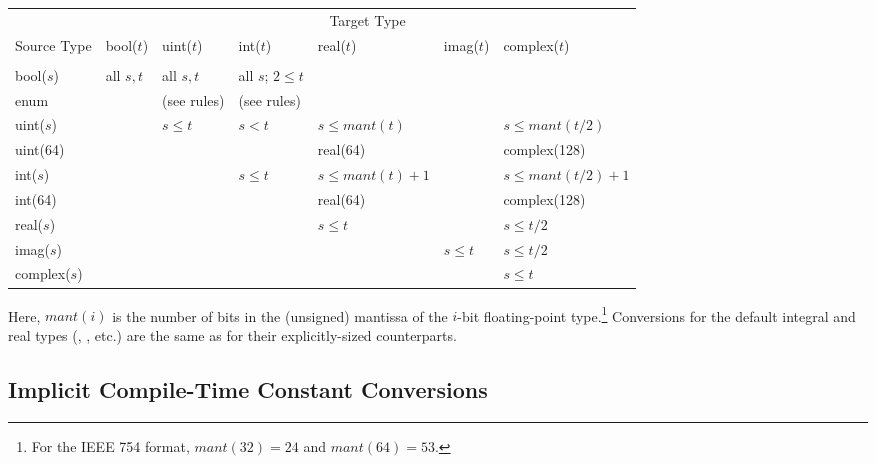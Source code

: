 \begin{center}
\begin{tabular}{l|llllll}
& \multicolumn{6}{c}{Target Type} \\ [4pt]

Source Type  & bool($t$) & uint($t$) & int($t$) & real($t$) & imag($t$) & complex($t$) \\  [3pt]

\cline{1-7} \\

bool($s$)    & all $s,t$ & all $s,t$   & all $s$; $2 \le t$ & & & \\ [7pt]

enum         &           & (see rules) & (see rules)        & & & \\ [7pt]

uint($s$)    & & $s \le t$ & $s < t$   & $s \le mant(t)$   & & $s \le mant(t/2)$   \\ [7pt]

uint(64)     & &           &           & real(64)          & & complex(128)        \\ [7pt]

int($s$)     & &           & $s \le t$ & $s \le mant(t)+1$ & & $s \le mant(t/2)+1$ \\ [7pt]

int(64)      & &           &           & real(64)          & & complex(128)        \\ [7pt]

real($s$)    & & & & $s \le t$ &           & $s \le t/2$ \\ [7pt]

imag($s$)    & & & &           & $s \le t$ & $s \le t/2$ \\ [7pt]

complex($s$) & & & &           &           & $s \le t$   \\ [5pt]

\end{tabular}
\end{center}
Here, $mant(i)$ is the number of bits in the (unsigned) mantissa of
the $i$-bit floating-point type.\footnote{For the IEEE 754 format,
$mant(32)=24$ and $mant(64)=53$.}
%
Conversions for the default integral and real types (,
, etc.) are the same as for their
explicitly-sized counterparts.

\subsection{Implicit Compile-Time Constant Conversions}
\label{Implicit_Compile_Time_Constant_Conversions}


